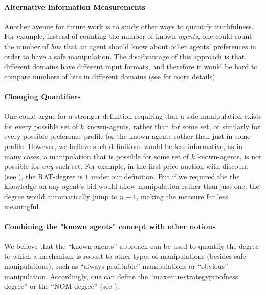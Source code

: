 \paragraph{Alternative Information Measurements}
Another avenue for future work is to study other ways to quantify truthfulness. For example, instead of counting the number of known \emph{agents}, one could count the number of \emph{bits} that an agent should know about other agents' preferences in order to have a safe manipulation. The disadvantage of this approach is that different domains have different input formats, and therefore it would be hard to compare numbers of bits in different domains (see  for more details).


\paragraph{Changing Quantifiers}
One could argue for a stronger definition requiring that a safe manipulation exists for every possible set of $k$ known-agents, rather than for some set, or similarly for every possible preference profile for the known agents rather than just in some profile.
However, we believe such definitions would be less informative, as in many cases, a manipulation that is possible for some set of $k$ known-agents, is not possible for \emph{any} such set. For example, in the first-price auction with discount (see ), the RAT-degree is $1$ under our definition. But if we required the the knowledge on any agent’s bid would allow manipulation rather than just one, the degree would automatically jump to $n-1$, making the measure far less meaningful.

\paragraph{Combining the "known agents" concept with other notions} 
We believe that the ``known agents'' approach can be used to quantify the degree to which a mechanism is robust to other types of manipulations (besides safe manipulations),
such as ``always-profitable'' manipulations or ``obvious'' manipulation.
Accordingly, one can define the ``max-min-strategyproofness degree'' or the ``NOM degree'' (see ).



